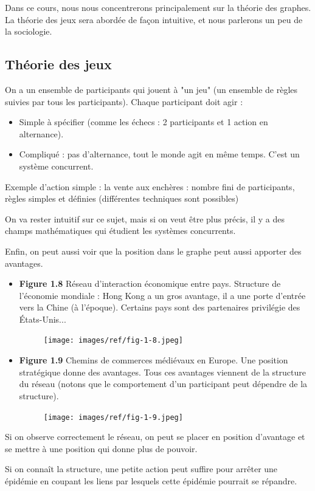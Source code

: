 Dans ce cours, nous nous concentrerons principalement sur la théorie des graphes. La théorie des jeux sera abordée de façon intuitive, et nous parlerons un peu de la sociologie.

\subsection{Théorie des jeux}
On a un ensemble de participants qui jouent à "un jeu" (un ensemble de règles suivies par tous les participants). Chaque participant doit agir : 

\begin{itemize}
\item Simple à spécifier (comme les échecs : 2 participants et 1 action en alternance). 
\item Compliqué : pas d'alternance, tout le monde agit en même temps. C'est un système concurrent.
\end{itemize}

Exemple d'action simple : la vente aux enchères : 
	nombre fini de participants,
	règles simples et définies (différentes techniques sont possibles)
	
\vspace{1cm}

On va rester intuitif sur ce sujet, mais si on veut être plus précis, il y a des champs mathématiques qui étudient les systèmes concurrents.

Enfin, on peut aussi voir que la position dans le graphe peut aussi apporter des avantages.

\begin{itemize}
	\item \textbf{Figure 1.8} Réseau d'interaction économique entre pays. Structure de l'économie mondiale : Hong Kong a un gros avantage, il a une porte d'entrée vers la Chine (à l'époque). Certains pays sont des partenaires privilégie des États-Unis... 
	\begin{figure}[!H]
\centering
\texttt{[image: images/ref/fig-1-8.jpeg]}
\end{figure}

	\item \textbf{Figure 1.9} Chemins de commerces médiévaux en Europe. Une position stratégique donne des avantages. Tous ces avantages viennent de la structure du réseau (notons que le comportement d'un participant peut dépendre de la structure).
\begin{figure}[!H]
\centering
\texttt{[image: images/ref/fig-1-9.jpeg]}
\end{figure}
\end{itemize}

Si on observe correctement le réseau, on peut se placer en position d'avantage et se mettre à une position qui donne plus de pouvoir.

Si on connaît la structure, une petite action peut suffire pour arrêter une épidémie en coupant les liens par lesquels cette épidémie pourrait se répandre.
